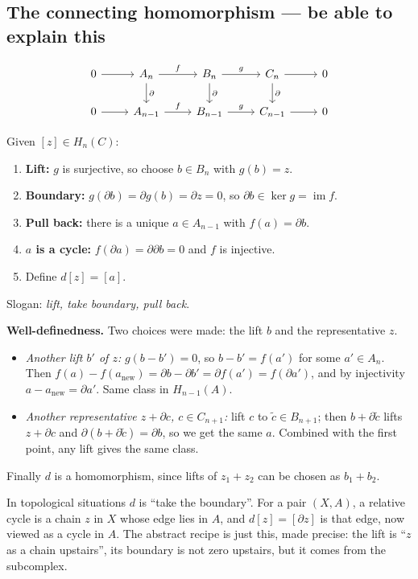 \documentclass[11pt]{article}
\newcommand{\im}{\operatorname{im}}
\newcommand{\fig}[2]{\begin{center}\resizebox{#2}{!}{}\end{center}}
\theoremstyle{definition}
\begin{document}
\subsection{The connecting homomorphism --- be able to explain this}
\[\begin{tikzcd}
0\ar[r] & A_n\ar[r,"f"]\ar[d,"\partial"] & B_n\ar[r,"g"]\ar[d,"\partial"] & C_n\ar[r]\ar[d,"\partial"] & 0\\
0\ar[r] & A_{n-1}\ar[r,"f"] & B_{n-1}\ar[r,"g"] & C_{n-1}\ar[r] & 0
\end{tikzcd}\]
\fig{connecting-hom}{0.55\textwidth}
Given $[z]\in H_n(C)$:
\begin{enumerate}
\item \textbf{Lift:} $g$ is surjective, so choose $b\in B_n$ with $g(b)=z$.
\item \textbf{Boundary:} $g(\partial b)=\partial g(b)=\partial z=0$, so $\partial b\in\ker g=\im f$.
\item \textbf{Pull back:} there is a unique $a\in A_{n-1}$ with $f(a)=\partial b$.
\item \textbf{$a$ is a cycle:} $f(\partial a)=\partial\partial b=0$ and $f$ is injective.
\item Define $d[z]=[a]$.
\end{enumerate}
Slogan: \emph{lift, take boundary, pull back}.

\textbf{Well-definedness.} Two choices were made: the lift $b$ and the representative $z$.
\begin{itemize}
\item \emph{Another lift $b'$ of $z$:} $g(b-b')=0$, so $b-b'=f(a')$ for some $a'\in A_n$. Then $f(a)-f(a_{\text{new}})=\partial b-\partial b'=\partial f(a')=f(\partial a')$, and by injectivity $a-a_{\text{new}}=\partial a'$. Same class in $H_{n-1}(A)$.
\item \emph{Another representative $z+\partial c$, $c\in C_{n+1}$:} lift $c$ to $\tilde c\in B_{n+1}$; then $b+\partial\tilde c$ lifts $z+\partial c$ and $\partial(b+\partial\tilde c)=\partial b$, so we get the same $a$. Combined with the first point, any lift gives the same class.
\end{itemize}
Finally $d$ is a homomorphism, since lifts of $z_1+z_2$ can be chosen as $b_1+b_2$.
\begin{intuition}
In topological situations $d$ is ``take the boundary''. For a pair $(X,A)$, a relative cycle is a chain $z$ in $X$ whose edge lies in $A$, and $d[z]=[\partial z]$ is that edge, now viewed as a cycle in $A$. The abstract recipe is just this, made precise: the lift is ``$z$ as a chain upstairs'', its boundary is not zero upstairs, but it comes from the subcomplex.
\end{intuition}
\end{document}
